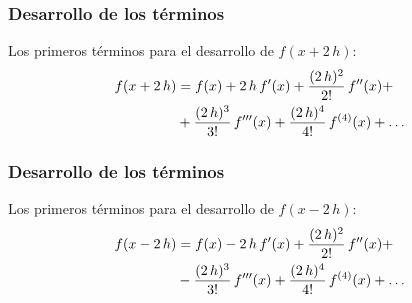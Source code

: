 \begin{frame}
\frametitle{Desarrollo de los términos}
Los primeros términos para el desarrollo de $f(x +  2 \, h)$:
\begin{align}
\begin{aligned}
f(x + 2 \, h) &= f(x) + 2 \, h \, {f}^{\prime} (x) + \dfrac{(2 \, h)^{2}}{2!} \, {f}^{\prime \prime} (x) + \\
&+ \dfrac{(2 \, h)^{3}}{3!} \, {f}^{\prime \prime \prime} (x) + \dfrac{(2 \, h)^{4}}{4!} \, {f}^{(4)} (x) + \ldots
\end{aligned}
\label{eq:ecuacion_diferencias_03}
\end{align}
\end{frame}
\begin{frame}
\frametitle{Desarrollo de los términos}
Los primeros términos para el desarrollo de $f(x -  2 \, h)$:
\begin{align}
\begin{aligned}
f(x - 2 \, h) &= f(x) - 2 \, h \, {f}^{\prime} (x) + \dfrac{(2 \, h)^{2}}{2!} \, {f}^{\prime \prime} (x) + \\
&- \dfrac{(2 \, h)^{3}}{3!} \, {f}^{\prime \prime \prime} (x) + \dfrac{(2 \, h)^{4}}{4!} \, {f}^{(4)} (x) + \ldots
\end{aligned}
\label{eq:ecuacion_diferencias_04}
\end{align}
\end{frame}
